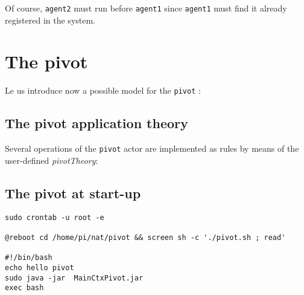 

Of course, \texttt{agent2} must run before \texttt{agent1} since \texttt{agent1} must find it already registered in the system.
 
\section{The pivot }
Le us introduce now a possible model for the \texttt{pivot} :
 



\subsection{The pivot application theory}
Several operations of the \texttt{pivot} actor are implemented as \tuprolog{} rules by means of the user-defined \textit{pivotTheory}:


 
\subsection{The pivot at start-up} 

\begin{Verbatim}[fontsize=\scriptsize, frame=single , label=Startup]
sudo crontab -u root -e

@reboot cd /home/pi/nat/pivot && screen sh -c './pivot.sh ; read'

#!/bin/bash
echo hello pivot
sudo java -jar  MainCtxPivot.jar 
exec bash
\end{Verbatim}	




 

\medskip 
\scriptsize
\framebox[15cm]{ %
\begin{minipage}{140mm}
\end{minipage}}
\normalsize
\medskip 